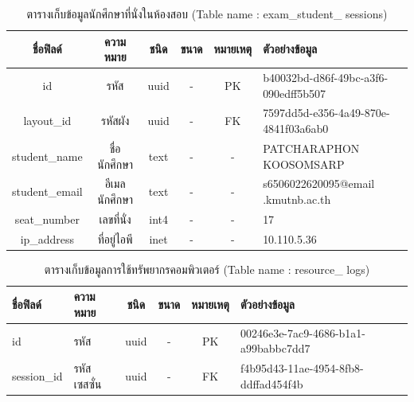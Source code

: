 \begin{table}[h!]
    \centering
    \caption{\fontSixTeen ตารางเก็บข้อมูลนักศึกษาที่นั่งในห้องสอบ (Table name : exam\_student\_ sessions)} 
    \label{tab3:examstudentsessions}
    \fontSixTeen
    \begin{tabularx}{\textwidth}{| c | c | c | c | c | X |}    
        \hline
        \textbf{ชื่อฟิลด์} & \textbf{ความหมาย} & \textbf{ชนิด} & \textbf{ขนาด} & \textbf{หมายเหตุ} & \textbf{ตัวอย่างข้อมูล} \\
        \hline
        id & รหัส & uuid & - & PK & b40032bd-d86f-49bc-a3f6-090edff5b507 \\
        \hline
        layout\_id & รหัสผัง & uuid & - & FK & 7597dd5d-e356-4a49-870e-4841f03a6ab0 \\
        \hline
        student\_name & ชื่อนักศึกษา & text & - & - & PATCHARAPHON KOOSOMSARP \\
        \hline
        student\_email & อีเมลนักศึกษา & text & - & - & s6506022620095@email .kmutnb.ac.th \\
        \hline
        seat\_number & เลขที่นั่ง & int4 & - & - & 17 \\
        \hline
        ip\_address & ที่อยู่ไอพี & inet & - & - & 10.110.5.36 \\
        \hline
    \end{tabularx}
\end{table}


\begin{table}[h!]
    \centering
    \caption{\fontSixTeen ตารางเก็บข้อมูลการใช้ทรัพยากรคอมพิวเตอร์ (Table name : resource\_ logs)}
    \label{tab3:resourcelogs1}
    \fontSixTeen
    \begin{tabular}{| p{2.5cm} | >{\raggedright}p{2cm} | c | c | c | p{4.5cm} |}
        \hline
        \textbf{ชื่อฟิลด์} & \textbf{ความหมาย} & \textbf{ชนิด} & \textbf{ขนาด} & \textbf{หมายเหตุ} & \textbf{ตัวอย่างข้อมูล} \\
        \hline
        id & รหัส & uuid & - & PK & 00246e3e-7ac9-4686-b1a1-a99babbc7dd7 \\
        \hline
        session\_id & รหัสเซสซั่น & uuid & - & FK & f4b95d43-11ae-4954-8fb8-ddffad454f4b \\
        \hline
    \end{tabular}
\end{table}

